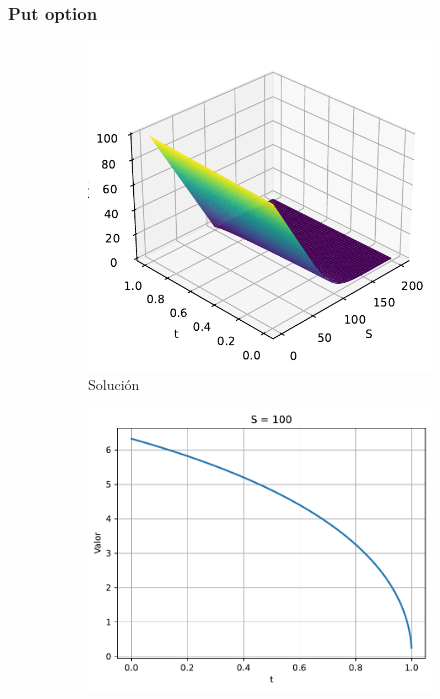 \subsubsection{Put option}
\begin{figure}[H]
    \centering
    \begin{subfigure}[b]{0.3\linewidth}
        \includegraphics[width=\linewidth]{Imagenes/Parte1/6_Sols/Put/Put3D.pdf}
        \caption{Solución}
    \end{subfigure}
    \begin{subfigure}[b]{0.3\linewidth}
        \includegraphics[width=\linewidth]{Imagenes/Parte1/6_Sols/Put/PutSFijo.pdf}

\end{subfigure}
\end{figure}
